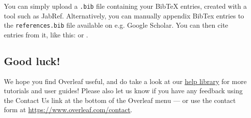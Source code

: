 You can simply upload a \texttt{.bib} file containing your BibTeX entries, created with a tool such as JabRef. Alternatively, you can manually appendix BibTex entries to the \texttt{references.bib} file available on e.g. Google Scholar. You can then cite entries from it, like this: \textcite{greenwade93} or \parencite{greenwade93}.


\subsection{Good luck!}

We hope you find Overleaf useful, and do take a look at our \href{https://www.overleaf.com/learn}{help library} for more tutorials and user guides! Please also let us know if you have any feedback using the Contact Us link at the bottom of the Overleaf menu --- or use the contact form at \url{https://www.overleaf.com/contact}.